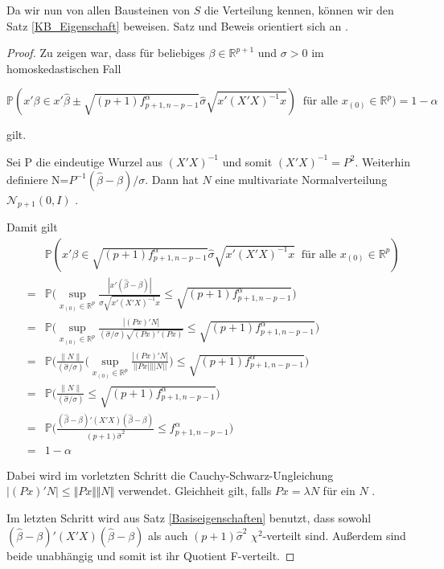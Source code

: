 \documentclass[12pt,a4paper]{article}
\theoremstyle{definition}
\theoremstyle{definition}
\theoremstyle{definition}
\theoremstyle{definition}
\begin{document}
Da wir nun von allen Bausteinen von $S$ die Verteilung kennen, können wir den Satz \ref{KB_Eigenschaft} beweisen. Satz und Beweis orientiert sich an \cite[66]{Liu64}.

\begin{proof}
Zu zeigen war, dass für beliebiges $\beta \in \mathbb{R}^{p+1}$ und $\sigma > 0$  im homoskedastischen Fall

\begin{equation*}
\mathbb{P}( x'\beta \in x' \hat{\beta} \pm \sqrt{(p+1) f^{\alpha}_{p+1,n-p-1}} \hat{\sigma} \sqrt{x' (X'X)^{-1}x}) ~ \text{ für alle } x_{(0)} \in \mathbb{R}^{p}) = 1 - \alpha
\end{equation*}

gilt. 

Sei \gls{P} die eindeutige Wurzel aus $(X'X)^{-1}$ und somit $(X'X)^{-1} = P^2$. Weiterhin definiere \gls{N}=$P^{-1}(\hat{\beta}-\beta)/\sigma$. Dann hat $N$ eine multivariate Normalverteilung $\mathscr{N}_{p+1}(0,I)$ . 

Damit gilt
\begin{eqnarray*}
&&\mathbb{P}(x'\beta \in \sqrt{(p+1) f^{\alpha}_{p+1,n-p-1}} \hat{\sigma} \sqrt{x'(X'X)^{-1}x} ~ \text{ für alle } x_{(0)} \in \mathbb{R}^{p}) \\ 
&=& \mathbb{P} \big ( \sup_{x_{(0)} \in \mathbb{R}^{p}} \frac{|x'(\hat{\beta}-\beta)|}{\hat{\sigma} \sqrt{x'(X'X)^{-1}x}} \leq \sqrt{(p+1) f^{\alpha}_{p+1,n-p-1}} \big ) \\
&=& \mathbb{P} \big ( \sup_{x_{(0)} \in \mathbb{R}^{p}} \frac{|(Px)'N|}{(\hat{\sigma}/\sigma)\sqrt{(Px)'(Px)}} \leq \sqrt{(p+1) f^{\alpha}_{p+1,n-p-1}} \big ) \\
&=& \mathbb{P} \big ( \frac{\parallel N \parallel}{(\hat{\sigma}/\sigma)} \bigg ( \sup_{x_{(0)} \in \mathbb{R}^{p}} \frac{|(Px)'N|}{||Px|| ||N||} \bigg ) \leq \sqrt{(p+1) f^{\alpha}_{p+1,n-p-1}} \big ) \\
&=& \mathbb{P} \big (\frac{\parallel N \parallel}{(\hat{\sigma}/\sigma)} \leq \sqrt{(p+1) f^{\alpha}_{p+1,n-p-1}} \big ) \\
&=& \mathbb{P} \big (\frac{(\hat{\beta}-\beta)'(X'X)(\hat{\beta}-\beta)}{(p+1)\hat{\sigma}^2} \leq f^{\alpha}_{p+1,n-p-1} \big ) \\
&=& 1 - \alpha
\end{eqnarray*}

Dabei wird im vorletzten Schritt  die Cauchy-Schwarz-Ungleichung $ \vert (Px)'N \vert \leq \Vert Px \Vert \Vert N \Vert $ verwendet. Gleichheit gilt, falls $P x = \lambda N$ für ein $N$ . 

Im letzten Schritt wird aus Satz \ref{Basiseigenschaften} benutzt, dass sowohl $(\hat{\beta}-\beta)'(X'X)(\hat{\beta}-\beta)$ als auch $(p+1)\hat{\sigma}^2$ $\chi^2$-verteilt sind. Außerdem sind beide unabhängig und somit ist ihr Quotient F-verteilt.

\end{proof}
\end{document}
